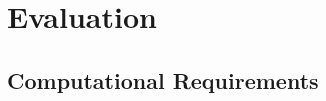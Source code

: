 \documentclass[a4paper, oneside]{csthesis}
\begin{document}
\section{Evaluation}



\subsection{Computational Requirements}

\end{document}
